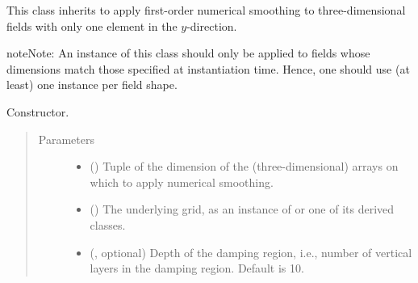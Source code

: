 \documentclass[letterpaper,10pt,english]{sphinxmanual}
\begin{document}
\begin{fulllineitems}
\label{\detokenize{api:tasmania.dycore.horizontal_smoothing.HorizontalSmoothingFirstOrderXZ}}
This class inherits {\hyperref[\detokenize{api:tasmania.dycore.horizontal_smoothing.HorizontalSmoothing}]{}} to apply first-order
numerical smoothing to three-dimensional fields with only one element in the \(y\)-direction.

\begin{sphinxadmonition}{note}{Note:}
An instance of this class should only be applied to fields whose dimensions match those specified at instantiation time.
Hence, one should use (at least) one instance per field shape.
\end{sphinxadmonition}

\begin{fulllineitems}
\label{\detokenize{api:tasmania.dycore.horizontal_smoothing.HorizontalSmoothingFirstOrderXZ.__init__}}
Constructor.
\begin{quote}\begin{description}
\item[{Parameters}] \leavevmode\begin{itemize}
\item {} 
 () \textendash{} Tuple of the dimension of the (three-dimensional) arrays on which to apply numerical smoothing.

\item {} 
 () \textendash{} The underlying grid, as an instance of {\hyperref[\detokenize{api:tasmania.grids.grid_xyz.GridXYZ}]{}} or one of its derived classes.

\item {} 
 (, optional) \textendash{} Depth of the damping region, i.e., number of vertical layers in the damping region. Default is 10.


\end{itemize}
\end{description}
\end{quote}
\end{fulllineitems}
\end{fulllineitems}
\end{document}
